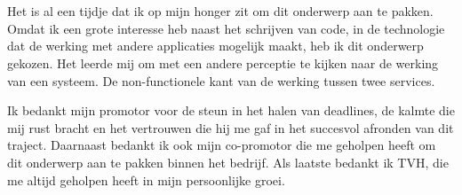 
\chapter*{}%
\label{ch:voorwoord}


Het is al een tijdje dat ik op mijn honger zit om dit onderwerp aan te pakken. 
Omdat ik een grote interesse heb naast het schrijven van code, in de technologie dat de werking met andere 
applicaties mogelijk maakt, heb ik dit onderwerp gekozen.
Het leerde mij om met een andere perceptie te kijken naar de werking van een systeem. De non-functionele kant van de werking tussen twee services.
\newline

Ik bedankt mijn promotor voor de steun in het halen van deadlines, 
de kalmte die mij rust bracht en het vertrouwen die hij me gaf in het succesvol afronden van dit traject.
Daarnaast bedankt ik ook mijn co-promotor die me geholpen heeft om dit onderwerp aan te pakken binnen het bedrijf.
Als laatste bedankt ik TVH, die me altijd geholpen heeft in mijn persoonlijke groei.